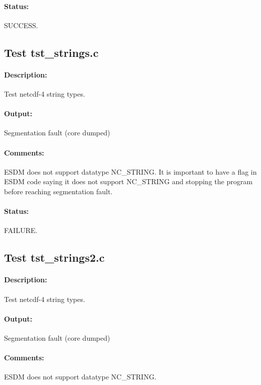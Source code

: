 \paragraph{Status:} SUCCESS.

\subsection{Test tst\_strings.c}

\paragraph{Description:} Test netcdf-4 string types.

\paragraph{Output:} Segmentation fault (core dumped)

\paragraph{Comments:} ESDM does not support datatype NC\_STRING. It is important to have a flag in ESDM code saying it does not support NC\_STRING and stopping the program before reaching segmentation fault.

\paragraph{Status:} FAILURE.

\subsection{Test tst\_strings2.c}

\paragraph{Description:} Test netcdf-4 string types.

\paragraph{Output:} Segmentation fault (core dumped)

\paragraph{Comments:} ESDM does not support datatype NC\_STRING.

